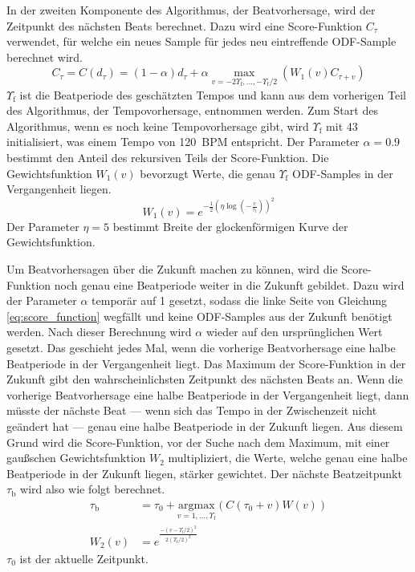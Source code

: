 {{{			%

			In der zweiten Komponente des Algorithmus,
				der Beatvorhersage,
				wird der Zeitpunkt des nächsten Beats berechnet.
			Dazu wird eine Score-Funktion $C_\tau$ verwendet,
				für welche ein neues Sample für jedes neu eintreffende ODF-Sample berechnet wird.
			\begin{equation}
				C_\tau = C(d_\tau) =
					(1 - \alpha)d_\tau +
					\alpha \max_{v = -2 \Upsilon_\text{f}, ..., -\Upsilon_\text{f} / 2}(W_1(v) C_{\tau + v})
				\label{eq:score_function}
			\end{equation}
			$\Upsilon_\text{f}$ ist die Beatperiode des geschätzten Tempos
				und kann aus dem vorherigen Teil des Algorithmus, der Tempovorhersage, entnommen werden.
			Zum Start des Algorithmus,
				wenn es noch keine Tempovorhersage gibt,
				wird $\Upsilon_\text{f}$ mit \num{43} initialisiert,
				was einem Tempo von \SI{120}{BPM} entspricht.
			Der Parameter $\alpha = 0.9$ bestimmt den Anteil des rekursiven Teils der Score-Funktion.
			Die Gewichtsfunktion $W_1(v)$ bevorzugt Werte, die genau $\Upsilon_\text{f}$ ODF-Samples in der Vergangenheit liegen.
			\begin{equation}
				W_1(v) = e^{-\frac{1}{2} \left( \eta \log \left( -\frac{v}{\tau_\text{f}} \right) \right)^2}
			\end{equation}
			Der Parameter $\eta = 5$ bestimmt Breite der glockenförmigen Kurve der Gewichtsfunktion.

			Um Beatvorhersagen über die Zukunft machen zu können,
				wird die Score-Funktion noch genau eine Beatperiode weiter in die Zukunft gebildet.
			Dazu wird der Parameter $\alpha$ temporär auf \num{1} gesetzt,
				sodass die linke Seite von Gleichung \eqref{eq:score_function} wegfällt
				und keine ODF-Samples aus der Zukunft benötigt werden.
			Nach dieser Berechnung wird $\alpha$ wieder auf den ursprünglichen Wert gesetzt.
			Das geschieht jedes Mal,
				wenn die vorherige Beatvorhersage eine halbe Beatperiode in der Vergangenheit liegt.
			Das Maximum der Score-Funktion in der Zukunft gibt den wahrscheinlichsten Zeitpunkt des nächsten Beats an.
			Wenn die vorherige Beatvorhersage eine halbe Beatperiode in der Vergangenheit liegt,
				dann müsste der nächste Beat
				--- wenn sich das Tempo in der Zwischenzeit nicht geändert hat ---
				genau eine halbe Beatperiode in der Zukunft liegen.
			Aus diesem Grund wird die Score-Funktion,
				vor der Suche nach dem Maximum,
				mit einer gaußschen Gewichtsfunktion $W_2$ multipliziert,
				die Werte, welche genau eine halbe Beatperiode in der Zukunft liegen,
				stärker gewichtet.
			Der nächste Beatzeitpunkt $\tau_\text{b}$ wird also wie folgt berechnet.
			\begin{align}
				\tau_\text{b} &= \tau_0 + \underset{v = 1, ..., \Upsilon_\text{f}}{\text{argmax}}(C(\tau_0 + v)W(v)) \\
				W_2(v) &= e^{\frac{-(v - \Upsilon_\text{f} / 2)^2}{2(\Upsilon_\text{f} / 2)^2}}
			\end{align}
			$\tau_0$ ist der aktuelle Zeitpunkt.
		}
	}

}
